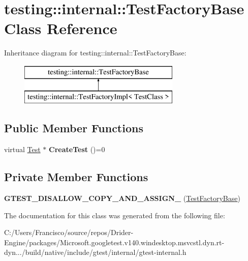 \hypertarget{classtesting_1_1internal_1_1_test_factory_base}{}\section{testing\+:\+:internal\+:\+:Test\+Factory\+Base Class Reference}
\label{classtesting_1_1internal_1_1_test_factory_base}
Inheritance diagram for testing\+:\+:internal\+:\+:Test\+Factory\+Base\+:\begin{figure}[H]
\begin{center}
\leavevmode
\includegraphics[height=2.000000cm]{classtesting_1_1internal_1_1_test_factory_base}
\end{center}
\end{figure}
\subsection*{Public Member Functions}
\begin{DoxyCompactItemize}
\item 
\mbox{\label{classtesting_1_1internal_1_1_test_factory_base_a07ac3ca0b196cdb092da0bb186b7c030}} 
virtual \hyperlink{classtesting_1_1_test}{Test} $\ast$ {\bfseries Create\+Test} ()=0
\end{DoxyCompactItemize}
\subsection*{Private Member Functions}
\begin{DoxyCompactItemize}
\item 
\mbox{\label{classtesting_1_1internal_1_1_test_factory_base_a85d7cb90e00f165e61a008be77293fb4}} 
{\bfseries G\+T\+E\+S\+T\+\_\+\+D\+I\+S\+A\+L\+L\+O\+W\+\_\+\+C\+O\+P\+Y\+\_\+\+A\+N\+D\+\_\+\+A\+S\+S\+I\+G\+N\+\_\+} (\hyperlink{classtesting_1_1internal_1_1_test_factory_base}{Test\+Factory\+Base})
\end{DoxyCompactItemize}


The documentation for this class was generated from the following file\+:\begin{DoxyCompactItemize}
\item 
C\+:/\+Users/\+Francisco/source/repos/\+Drider-\/\+Engine/packages/\+Microsoft.\+googletest.\+v140.\+windesktop.\+msvcstl.\+dyn.\+rt-\/dyn.../build/native/include/gtest/internal/gtest-\/internal.\+h\end{DoxyCompactItemize}
